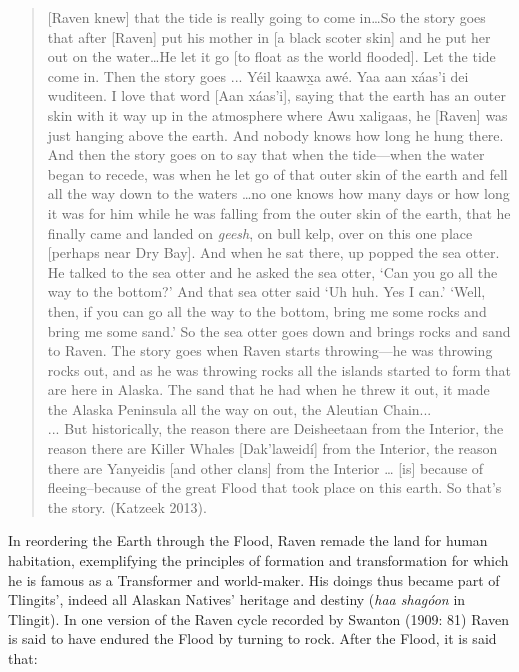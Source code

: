 \begin{quote}
    [Raven knew] that the tide is really going to come in…So the story goes that after [Raven] put his mother in [a black scoter skin] and he put her out on the water…He let it go [to float as the world flooded].  Let the tide come in.  Then the story goes ... Yéil kaawx̲a awé. Yaa aan xáas’i dei wuditeen.  I love that word [Aan xáas’i], saying that the earth has an outer skin with it way up in the atmosphere where Awu xaligaas, he [Raven] was just hanging above the earth. And nobody knows how long he hung there.  And then the story goes on to say that when the tide—when the water began to recede, was when he let go of that outer skin of the earth and fell all the way down to the waters …no one knows how many days or how long it was for him while he was falling from the outer skin of the earth, that he finally came and landed on \textit{geesh}, on bull kelp, over on this one place [perhaps near Dry Bay].  And when he sat there, up popped the sea otter.  He talked to the sea otter and he asked the sea otter, ‘Can you go all the way to the bottom?’  And that sea otter said ‘Uh huh.  Yes I can.’  ‘Well, then, if you can go all the way to the bottom, bring me some rocks and bring me some sand.’  So the sea otter goes down and brings rocks and sand to Raven.  The story goes when Raven starts throwing---he was throwing rocks out, and as he was throwing rocks all the islands started to form that are here in Alaska.  The sand that he had when he threw it out, it made the Alaska Peninsula all the way on out, the Aleutian Chain... \\

    ... But historically, the reason there are Deisheetaan from the Interior, the reason there are Killer Whales [Dak’laweidí] from the Interior, the reason there are Yanyeidis [and other clans] from the Interior … [is] because of fleeing--because of the great Flood that took place on this earth.  So that’s the story. (Katzeek 2013).
\end{quote}

\noindent
In reordering the Earth through the Flood, Raven remade the land for human habitation, exemplifying the principles of formation and transformation for which he is famous as a Transformer and world-maker. His doings thus became part of Tlingits’, indeed all Alaskan Natives’ heritage and destiny (\textit{haa shagóon} in Tlingit). In one version of the Raven cycle recorded by Swanton (1909: 81) Raven is said to have endured the Flood by turning to rock. After the Flood, it is said that:

